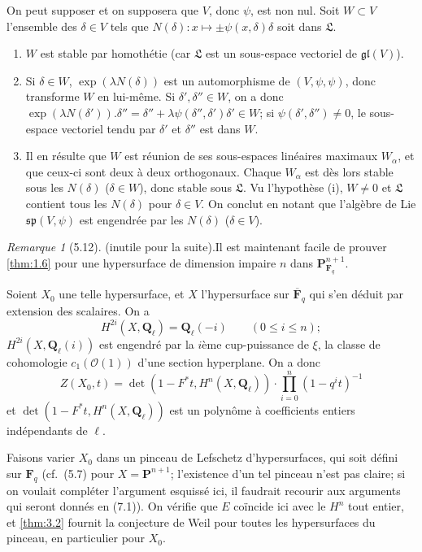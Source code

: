 \documentclass[12pt,a4paper]{amsart}
\theoremstyle{plain}
\theoremstyle{definition}
\theoremstyle{remark}
\newtheorem{remarque}[theoreme]{Remarque}
\newcommand{\Q}{\mathbf{Q}}
\newcommand{\F}{\mathbf{F}}
\numberwithin{equation}{section}
\begin{document}
On peut supposer et on supposera que $V$, donc $\psi$, est non nul. Soit $W\subset V$ l'ensemble des $\delta\in V$ tels que $N(\delta):x\mapsto\pm\psi(x,\delta)\delta$ soit dans $\mathfrak{L}$.
\begin{enumerate}
\item[a)] $W$ est stable par homoth\'etie (car $\mathfrak{L}$ est un sous-espace vectoriel de $\mathfrak{gl}(V)$).
\item[b)] Si $\delta\in W$, $\exp(\lambda N(\delta))$ est un automorphisme de $(V,\psi,\psi)$, donc transforme $W$ en lui-m\^eme. Si $\delta',\delta''\in W$, on a donc $\exp(\lambda N(\delta')).\delta''=\delta''+\lambda\psi(\delta'',\delta')\delta'\in W$; si $\psi(\delta',\delta'')\not=0$, le sous-espace vectoriel tendu par $\delta'$ et $\delta''$ est dans $W$.
\item[c)] Il en r\'esulte que $W$ est r\'eunion de ses sous-espaces lin\'eaires maximaux $W_\alpha$, et que ceux-ci sont deux \`a deux orthogonaux. Chaque $W_\alpha$ est d\`es lors stable sous les $N(\delta)$ ($\delta\in W$), donc stable sous $\mathfrak{L}$. Vu l'hypoth\`ese (i), $W\not=0$ et $\mathfrak{L}$ contient tous les $N(\delta)$ pour $\delta\in V$. On conclut en notant que l'alg\`ebre de Lie $\mathfrak{sp}(V,\psi)$ est engendr\'ee par les $N(\delta)$ ($\delta\in V$).
\end{enumerate}

\begin{remarque}[5.12] (inutile pour la suite).\label{rem:5.12}
Il est maintenant facile de prouver \eqref{thm:1.6} pour une hypersurface de dimension impaire $n$ dans $\mathbf{P}^{n+1}_{\F_q}$.

Soient $X_0$ une telle hypersurface, et $X$ l'hypersurface sur $\overline{\F}_q$ qui s'en d\'eduit par extension des scalaires. On a
\[
H^{2i}(X,\Q_\ell) = \Q_\ell(-i) \qquad (0\le i\le n);
\]
$H^{2i}(X,\Q_\ell(i))$ est engendr\'e par la $i$\`eme cup-puissance de $\xi$, la classe de cohomologie $c_1(\mathcal{O}(1))$ d'une section hyperplane. On a donc
\[
Z(X_0,t) = \det(1-F^\ast t, H^n(X,\Q_\ell)) \cdot \prod_{i=0}^n (1-q^i t)^{-1}
\]
et $\det(1-F^\ast t, H^n(X,\Q_\ell))$ est un polyn\^ome \`a coefficients entiers ind\'ependants de $\ell$.

Faisons varier $X_0$ dans un pinceau de Lefschetz d'hypersurfaces, qui soit d\'efini sur $\F_q$ (cf.\ (5.7) pour $X=\mathbf{P}^{n+1}$; l'existence d'un tel pinceau n'est pas claire; si on voulait compl\'eter l'argument esquiss\'e ici, il faudrait recourir aux arguments qui seront donn\'es en (7.1)). On v\'erifie que $E$ co\"incide ici avec le $H^n$ tout entier, et \eqref{thm:3.2} fournit la conjecture de Weil pour toutes les hypersurfaces du pinceau, en particulier pour $X_0$.
\end{remarque}
\end{document}
